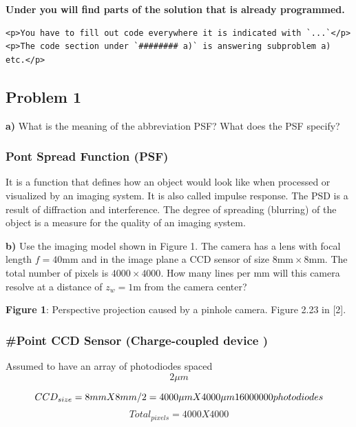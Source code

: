 \documentclass[border=1in]{standalone}
\begin{document}
\begin{minipage}{21cm}
\textbf{Under you will find parts of the solution that is already
programmed.}

\begin{verbatim}
<p>You have to fill out code everywhere it is indicated with `...`</p>
<p>The code section under `######## a)` is answering subproblem a) etc.</p>
\end{verbatim}

    \hypertarget{problem-1}{%
\subsection{Problem 1}\label{problem-1}}

    \textbf{a)} What is the meaning of the abbreviation PSF? What does the
PSF specify?

    \hypertarget{pont-spread-function-psf}{%
\subsubsection{Pont Spread Function
(PSF)}\label{pont-spread-function-psf}}

It is a function that defines how an object would look like when
processed or visualized by an imaging system. It is also called impulse
response. The PSD is a result of diffraction and interference. The
degree of spreading (blurring) of the object is a measure for the
quality of an imaging system.

    \textbf{b)} Use the imaging model shown in Figure 1. The camera has a
lens with focal length \(f = 40\text{mm}\) and in the image plane a CCD
sensor of size \(8\text{mm} \times 8\text{mm}\). The total number of
pixels is \(4000 \times 4000\). How many lines per mm will this camera
resolve at a distance of \(z_w = 1\text{m}\) from the camera center?

    \textbf{Figure 1}: Perspective projection caused by a pinhole camera.
Figure 2.23 in {[}2{]}.

    \hypertarget{point-ccd-sensor-charge-coupled-device}{%
\subsubsection{\#Point CCD Sensor (Charge-coupled device
)}\label{point-ccd-sensor-charge-coupled-device}}

Assumed to have an array of photodiodes spaced \[2 \mu m\]

\[CCD_{size}=8mm X 8mm/2 = 4000 \mu m \space X \space 4000 \mu m \space 16 000 000 \space photodiodes\]
\[Total_{pixels}=4000X4000\]


\end{minipage}
\end{document}
